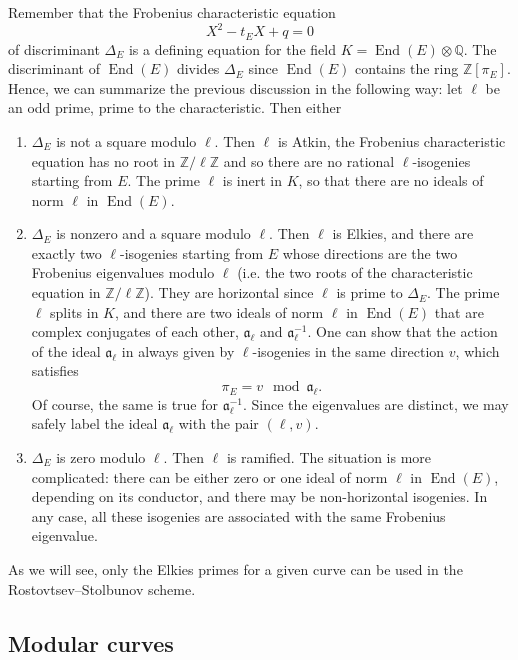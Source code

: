 \documentclass{article}
\newcommand{\Q}{\mathbb{Q}}
\newcommand{\Z}{\mathbb{Z}}
\renewcommand{\frak}{\mathfrak}
\theoremstyle{definition}
\DeclareMathOperator{\End}{End}
\begin{document}
Remember that the Frobenius characteristic equation
\[
X^2 - t_E X + q = 0
\]
of discriminant $\Delta_E$ is a defining equation for the field $K = \End(E)
\otimes\Q$. The discriminant of $\End(E)$ divides $\Delta_E$ since $\End(E)$ 
contains the ring $\Z[\pi_E]$. Hence, we can summarize the previous discussion 
in the following way: let $\ell$ be an odd prime, prime to the characteristic. 
Then either
\begin{enumerate}
\item $\Delta_E$ is not a square modulo $\ell$. Then $\ell$ is Atkin, the Frobenius
characteristic equation has no root in $\Z/\ell\Z$ and so there 
are no rational $\ell$-isogenies starting from $E$. The prime $\ell$ is inert 
in $K$, so that there are no ideals of norm $\ell$ in $\End(E)$.
\item $\Delta_E$ is nonzero and a square modulo $\ell$. Then $\ell$ is Elkies, 
and there are exactly two $\ell$-isogenies starting from $E$ whose directions 
are the two Frobenius eigenvalues modulo $\ell$ (i.e. the two roots of the
characteristic equation in $\Z/\ell\Z$). They are horizontal since $\ell
$ is prime to $\Delta_E$. The prime $\ell$ splits in $K$, and there are two 
ideals of norm $\ell$ in $\End(E)$ that are complex conjugates of each other, $
\frak a_\ell$ and $\frak a_\ell^{-1}$. One can show that the action of the 
ideal $\frak a_\ell$ in always given by $\ell$-isogenies in the same direction $
v$, which satisfies
\[
\pi_E = v \mod \frak a_\ell.
\]
Of course, the same is true for $\frak a_\ell^{-1}$. Since the eigenvalues are 
distinct, we may safely label the ideal $\frak a_\ell$ with the pair $(\ell, 
v)$.
\item $\Delta_E$ is zero modulo $\ell$. Then $\ell$ is ramified. The situation 
is more complicated: there can be either zero or one ideal of norm $\ell$ in $
\End(E)$, depending on its conductor, and there may be non-horizontal 
isogenies. In any case, all these isogenies are associated with the same 
Frobenius eigenvalue.

\end{enumerate}

As we will see, only the Elkies primes for a given curve can be used in the
Rostovtsev--Stolbunov scheme.

\subsection{Modular curves}
\end{document}
